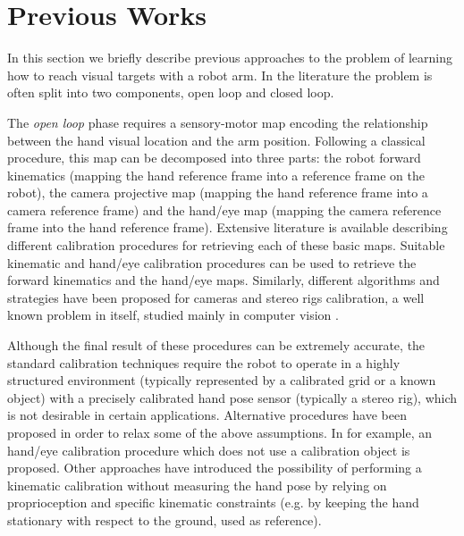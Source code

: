 \section{Previous Works}



In this section we briefly describe previous approaches to the problem of 
learning how to reach visual targets with a robot arm. In the literature 
the problem is often split into two components, open loop and closed loop.

The {\em open loop} phase requires a sensory-motor map encoding the 
relationship between the hand visual location and the arm position. 
Following a classical procedure, this map can be decomposed 
into three parts: the robot forward kinematics (mapping the hand reference 
frame into a reference frame on the robot), the camera projective map (mapping 
the hand reference frame into a camera reference frame) and the hand/eye map 
(mapping the camera reference frame into the hand reference frame). Extensive 
literature is available describing different calibration procedures for 
retrieving each of these basic maps. Suitable kinematic 
\cite{Hollerbach96calibration} and hand/eye \cite{Tsai88calibration} 
calibration procedures can be used to retrieve the forward kinematics and 
the hand/eye maps. Similarly, different algorithms and strategies have been 
proposed for cameras and stereo rigs calibration, a well known 
problem in itself, studied mainly in computer vision \cite{Soatto03vision}.

Although the final result of these procedures can be extremely accurate, the 
standard calibration techniques require the robot to operate in a highly 
structured environment (typically represented by a calibrated grid or a 
known object) with a precisely calibrated hand pose sensor (typically a 
stereo rig), which is not desirable in certain applications. Alternative 
procedures have been proposed in order to relax some of the above 
assumptions. In \cite{AHE01} for example, an hand/eye calibration 
procedure which does not use a calibration object is proposed. Other 
approaches have introduced the possibility of performing a kinematic 
calibration without measuring the hand pose \cite{Bennett91calibration} 
by relying on proprioception and specific kinematic constraints 
(e.g. by keeping the hand stationary with respect to the ground, used as 
reference).

